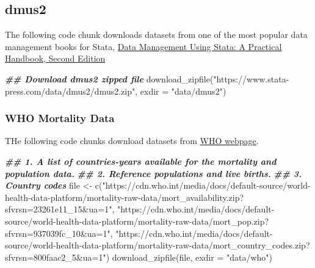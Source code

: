 \documentclass[
]{book}
\newenvironment{Shaded}{\begin{snugshade}}{\end{snugshade}}
\newcommand{\AttributeTok}[1]{\textcolor[rgb]{0.77,0.63,0.00}{#1}}
\newcommand{\DocumentationTok}[1]{\textcolor[rgb]{0.56,0.35,0.01}{\textbf{\textit{#1}}}}
\newcommand{\FunctionTok}[1]{\textcolor[rgb]{0.00,0.00,0.00}{#1}}
\newcommand{\NormalTok}[1]{#1}
\newcommand{\OtherTok}[1]{\textcolor[rgb]{0.56,0.35,0.01}{#1}}
\newcommand{\StringTok}[1]{\textcolor[rgb]{0.31,0.60,0.02}{#1}}
\begin{document}
\hypertarget{dmus2}{%
\subsection{dmus2}\label{dmus2}}

The following code chunk downloads datasets from one of the most popular data management books for Stata, \href{https://www.stata-press.com/data/dmus2.html}{Data Management Using Stata: A Practical Handbook, Second Edition}

\begin{Shaded}
\begin{Highlighting}[]
\DocumentationTok{\#\# Download dmus2 zipped file}
\FunctionTok{download\_zipfile}\NormalTok{(}\StringTok{"https://www.stata{-}press.com/data/dmus2/dmus2.zip"}\NormalTok{, }
                 \AttributeTok{exdir =} \StringTok{"data/dmus2"}\NormalTok{)}
\end{Highlighting}
\end{Shaded}

\hypertarget{who-mortality-data}{%
\subsubsection{WHO Mortality Data}\label{who-mortality-data}}

THe following code chunks download datasets from \href{https://www.who.int/data/data-collection-tools/who-mortality-database}{WHO webpage}.

\begin{Shaded}
\begin{Highlighting}[]
\DocumentationTok{\#\# 1. A list of countries{-}years available for the mortality and population data.}
\DocumentationTok{\#\# 2. Reference populations and live births.}
\DocumentationTok{\#\# 3. Country codes}
\NormalTok{file }\OtherTok{\textless{}{-}} \FunctionTok{c}\NormalTok{(}\StringTok{"https://cdn.who.int/media/docs/default{-}source/world{-}health{-}data{-}platform/mortality{-}raw{-}data/mort\_availability.zip?sfvrsn=23261e11\_15\&ua=1"}\NormalTok{, }
          \StringTok{"https://cdn.who.int/media/docs/default{-}source/world{-}health{-}data{-}platform/mortality{-}raw{-}data/mort\_pop.zip?sfvrsn=937039fc\_10\&ua=1"}\NormalTok{, }
          \StringTok{"https://cdn.who.int/media/docs/default{-}source/world{-}health{-}data{-}platform/mortality{-}raw{-}data/mort\_country\_codes.zip?sfvrsn=800faac2\_5\&ua=1"}\NormalTok{)}
\FunctionTok{download\_zipfile}\NormalTok{(file, }\AttributeTok{exdir =} \StringTok{"data/who"}\NormalTok{)}
\end{Highlighting}
\end{Shaded}
\end{document}
